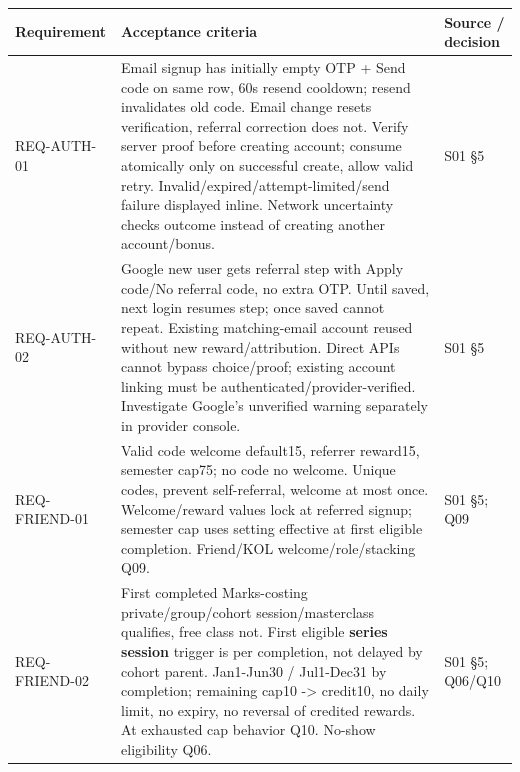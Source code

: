 \documentclass[11pt,a4paper]{article}
\newcounter{none}
\begin{document}
{\def\LTcaptype{none} %
\begin{longtable}[]{@{}
  >{\raggedright\arraybackslash}p{}
  >{\raggedright\arraybackslash}p{}
  >{\raggedright\arraybackslash}p{}@{}}
\toprule\noalign{}
\begin{minipage}[b]{\linewidth}\raggedright
Requirement
\end{minipage} & \begin{minipage}[b]{\linewidth}\raggedright
Acceptance criteria
\end{minipage} & \begin{minipage}[b]{\linewidth}\raggedright
Source / decision
\end{minipage} \\
\midrule\noalign{}
\endhead
\bottomrule\noalign{}
\endlastfoot
REQ-AUTH-01 & Email signup has initially empty OTP + Send code on same row, 60s resend cooldown; resend invalidates old code. Email change resets verification, referral correction does not. Verify server proof before creating account; consume atomically only on successful create, allow valid retry. Invalid/expired/attempt-limited/send failure displayed inline. Network uncertainty checks outcome instead of creating another account/bonus. & S01 §5 \\
REQ-AUTH-02 & Google new user gets referral step with Apply code/No referral code, no extra OTP. Until saved, next login resumes step; once saved cannot repeat. Existing matching-email account reused without new reward/attribution. Direct APIs cannot bypass choice/proof; existing account linking must be authenticated/provider-verified. Investigate Google's unverified warning separately in provider console. & S01 §5 \\
REQ-FRIEND-01 & Valid code welcome default15, referrer reward15, semester cap75; no code no welcome. Unique codes, prevent self-referral, welcome at most once. Welcome/reward values lock at referred signup; semester cap uses setting effective at first eligible completion. Friend/KOL welcome/role/stacking Q09. & S01 §5; Q09 \\
REQ-FRIEND-02 & First completed Marks-costing private/group/cohort session/masterclass qualifies, free class not. First eligible \textbf{series session} trigger is per completion, not delayed by cohort parent. Jan1-Jun30 / Jul1-Dec31 by completion; remaining cap10 -\textgreater{} credit10, no daily limit, no expiry, no reversal of credited rewards. At exhausted cap behavior Q10. No-show eligibility Q06. & S01 §5; Q06/Q10 \\

\end{longtable}}
\end{document}
